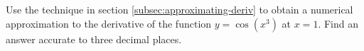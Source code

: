 Use the technique in section \ref{subsec:approximating-deriv} to
obtain a numerical approximation to the derivative of the
function $y=\cos (x^3)$ at $x=1$. Find an answer accurate to
three decimal places.\answercheck
